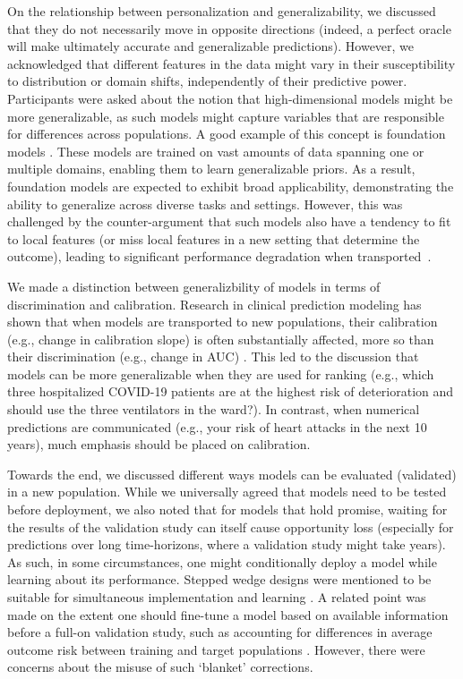 On the relationship between personalization and generalizability, we discussed that they do not necessarily move in opposite directions (indeed, a perfect oracle will make ultimately accurate and generalizable predictions). However, we acknowledged that different features in the data might vary in their susceptibility to distribution or domain shifts, independently of their predictive power. Participants were asked about the notion that high-dimensional models might be more generalizable, as such models might capture variables that are responsible for differences across populations. A good example of this concept is foundation models \citep{bommasani2021opportunities}. These models are trained on vast amounts of data spanning one or multiple domains, enabling them to learn generalizable priors. As a result, foundation models are expected to exhibit broad applicability, demonstrating the ability to generalize across diverse tasks and settings. However, this was challenged by the counter-argument that such models also have a tendency to fit to local features (or miss local features in a new setting that determine the outcome), leading to significant performance degradation when transported~\citep{kernbach2022foundations, tirumala2022memorization}.

We made a distinction between generalizbility of models in terms of discrimination and calibration. Research in clinical prediction modeling has shown that when models are transported to new populations, their calibration (e.g., change in calibration slope) is often substantially affected, more so than their discrimination (e.g., change in AUC) \citep{van2019calibration, gulati2022generalizability}. This led to the discussion that models can be more generalizable when they are used for ranking (e.g., which three hospitalized COVID-19 patients are at the highest risk of deterioration and should use the three ventilators in the ward?). In contrast, when numerical predictions are communicated (e.g., your risk of heart attacks in the next 10 years), much emphasis should be placed on calibration. 

Towards the end, we discussed different ways models can be evaluated (validated) in a new population. While we universally agreed that models need to be tested before deployment, we also noted that for models that hold promise, waiting for the results of the validation study can itself cause opportunity loss (especially for predictions over long time-horizons, where a validation study might take years). As such, in some circumstances, one might conditionally deploy a model while learning about its performance. Stepped wedge designs were mentioned to be suitable for simultaneous implementation and learning \citep{kappen2018evaluating}. A related point was made on the extent one should fine-tune a model based on available information before a full-on validation study, such as accounting for differences in average outcome risk between training and target populations \citep{sadatsafavi2022marginal}. However, there were concerns about the misuse of such `blanket' corrections. 

